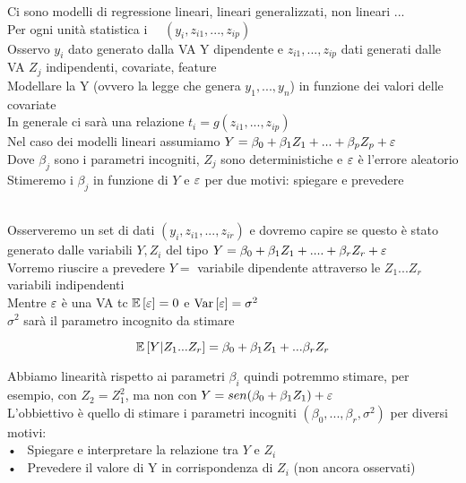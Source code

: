 

Ci sono modelli di regressione lineari, lineari generalizzati, non lineari ...\\


Per ogni unità statistica i \ \ $(y_i, z_{i1},...,z_{ip})$\\
Osservo $y_i$ dato generato dalla VA Y dipendente e $z_{i1},...,z_{ip}$ dati generati dalle VA $Z_j$ indipendenti, covariate, feature\\

Modellare la Y (ovvero la legge che genera $y_1,...,y_n$) in funzione dei valori delle covariate \\

In generale ci sarà una relazione $t_i=g(z_{i1},...,z_{ip})$\\

Nel caso dei modelli lineari assumiamo $Y=\beta_0+\beta_1Z_1+...+\beta_p Z_p + \varepsilon$\\
Dove $\beta_j$ sono i parametri incogniti, $Z_j$ sono deterministiche e $\varepsilon$ è l'errore aleatorio\\

Stimeremo i $\beta_j$ in funzione di $Y$ e $\varepsilon$ per due motivi: spiegare e prevedere\\ \\



Osserveremo un set di dati $(y_i,z_{i1},...,z_{ir})$ e dovremo capire se questo è stato generato dalle variabili $Y, Z_i$ del tipo $Y=\beta_0+\beta_1Z_1 + .... + \beta_rZ_r +\varepsilon$\\

Vorremo riuscire a prevedere  $Y = $ variabile dipendente attraverso le $Z_1...Z_r$ variabili indipendenti\\

Mentre $\varepsilon$ è una VA tc $\mathbb{E} \left[ \varepsilon \right]=0$  e $\text{Var} \left[ \varepsilon \right]=\sigma^2$\\
$\sigma^2$ sarà il  parametro incognito da stimare

\[
\mathbb{E} \left[ Y|Z_1...Z_r \right]=\beta_0+\beta_1Z_1 + ... \beta_rZ_r
\]

Abbiamo linearità rispetto ai parametri $\beta_i$ quindi potremmo stimare, per esempio, con $Z_2=Z_1^2$, ma non con $Y=sen(\beta_0+\beta_1Z_1)+\varepsilon$\\


L'obbiettivo è quello di stimare i parametri incogniti $(\beta_0,...,\beta_r,\sigma^2)$ per diversi motivi:\\
• \ Spiegare e interpretare la relazione tra $Y$ e $Z_i$\\
• \ Prevedere il valore di Y in corrispondenza di $Z_i$ (non ancora osservati)\\

